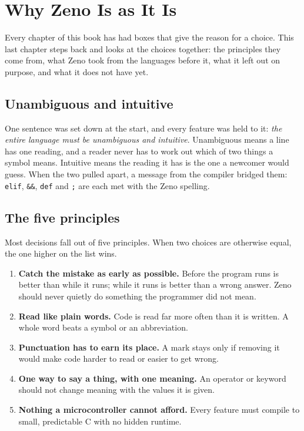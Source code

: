 \chapter{Why Zeno Is as It Is}\label{ch-design}

Every chapter of this book has had boxes that give the reason for a
choice. This last chapter steps back and looks at the choices
together: the principles they come from, what Zeno took from the
languages before it, what it left out on purpose, and what it does
not have yet.

\section{Unambiguous and intuitive}

One sentence was set down at the start, and every feature was held to
it: \emph{the entire language must be unambiguous and intuitive}.
Unambiguous means a line has one reading, and a reader never has to
work out which of two things a symbol means. Intuitive means the
reading it has is the one a newcomer would guess. When the two pulled
apart, a message from the compiler bridged them: \verb|elif|,
\verb|&&|, \verb|def| and \verb|;| are each met with the Zeno spelling.

\section{The five principles}

Most decisions fall out of five principles. When two choices are
otherwise equal, the one higher on the list wins.

\begin{enumerate}
\item \textbf{Catch the mistake as early as possible.} Before the
  program runs is better than while it runs; while it runs is better
  than a wrong answer. Zeno should never quietly do something the
  programmer did not mean.
\item \textbf{Read like plain words.} Code is read far more often than
  it is written. A whole word beats a symbol or an abbreviation.
\item \textbf{Punctuation has to earn its place.} A mark stays only if
  removing it would make code harder to read or easier to get wrong.
\item \textbf{One way to say a thing, with one meaning.} An operator or
  keyword should not change meaning with the values it is given.
\item \textbf{Nothing a microcontroller cannot afford.} Every feature
  must compile to small, predictable C with no hidden runtime.
\end{enumerate}

